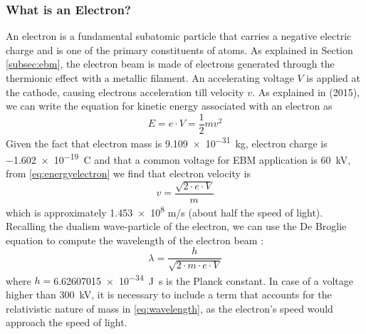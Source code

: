 \subsubsection{What is an Electron?}
\label{sssec:electron}
An electron is a fundamental subatomic particle that carries a negative electric charge and is one of the primary constituents of atoms. As explained in Section \ref{subsec:ebm}, the electron beam is made of electrons generated through the thermionic effect with a metallic filament. An accelerating voltage $V$ is applied at the cathode, causing electrons acceleration till velocity $v$. As explained in \citeauthor{krumeich_properties_2015} (2015), we can write the equation for kinetic energy associated with an electron as 
\begin{equation}
    \label{eq:energyelectron}
    E  = e\cdot V = \frac{1}{2}mv^2
\end{equation}
Given the fact that electron mass is \SI{9.109e-31}{\kilo\gram}, electron charge is \SI{-1.602e-19}{\coulomb} and that a common voltage for EBM application is \SI{60}{\kilo\volt}, from \ref{eq:energyelectron} we find that electron velocity is
\begin{equation}
\label{eq:velocityelectron}
v=\frac{\sqrt{2\cdot e\cdot V}}{m}
\end{equation}
which is approximately \num{1.453e8} \unit{m/s} (about half the speed of light). Recalling the dualism wave-particle of the electron, we can use the De Broglie equation to compute the wavelength of the electron beam \cite{krumeich_properties_2015}:
\begin{equation}
\label{eq:wavelength}
    \lambda = \frac{h}{\sqrt{2\cdot m \cdot e \cdot V}}
\end{equation}
where $h=$\SI{6.62607015e-34}{\joule.\second} is the Planck constant. In case of a voltage higher than \SI{300}{\kilo\volt}, it is necessary to include a term that accounts for the relativistic nature of mass in \ref{eq:wavelength}, as the electron's speed would approach the speed of light.
